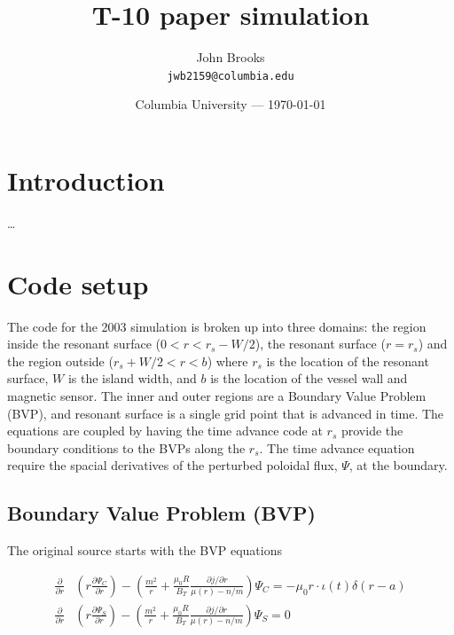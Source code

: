 \documentclass{article}
\title{T-10 paper simulation} %
\author{John Brooks\\ \texttt{jwb2159@columbia.edu}} %
\date{Columbia University --- \today} %
\begin{document}
\maketitle %


\section{Introduction} %

\ldots




\section{Code setup} %

The code for the 2003 simulation is broken up into three domains: the region inside the resonant surface ($0<r<r_s-W/2$), the resonant surface ($r=r_s$) and the region outside ($r_s+W/2<r<b$) where $r_s$ is the location of the resonant surface, $W$ is the island width, and $b$ is the location of the vessel wall and magnetic sensor.  The inner and outer regions are a Boundary Value Problem (BVP), and resonant surface is a single grid point that is advanced in time.  The equations are coupled by having the time advance code at $r_s$ provide the boundary conditions to the BVPs along the $r_s$.  The time advance equation require the spacial derivatives of the perturbed poloidal flux, $\Psi$, at the boundary.  


\subsection{Boundary Value Problem (BVP)}


The original source starts with the BVP equations


\begin{equation} \label{eq:BVPEquations}
\begin{split}
\frac{\partial}{\partial r} &  \left( r \frac{\partial \Psi_C}{\partial r} \right)-\left( \frac{m^2}{r} +\frac{\mu_0 R}{B_T} \frac{\partial j / \partial r}{\mu(r)-n/m} \right) \Psi_C  = - \mu_0r \cdot \iota(t) \delta (r-a)  \\
 \frac{\partial}{\partial r} &  \left( r \frac{\partial \Psi_S}{\partial r} \right)-\left( \frac{m^2}{r} +\frac{\mu_0 R}{B_T} \frac{\partial j / \partial r}{\mu(r)-n/m} \right) \Psi_S =0
\end{split}
\end{equation}
\end{document}
